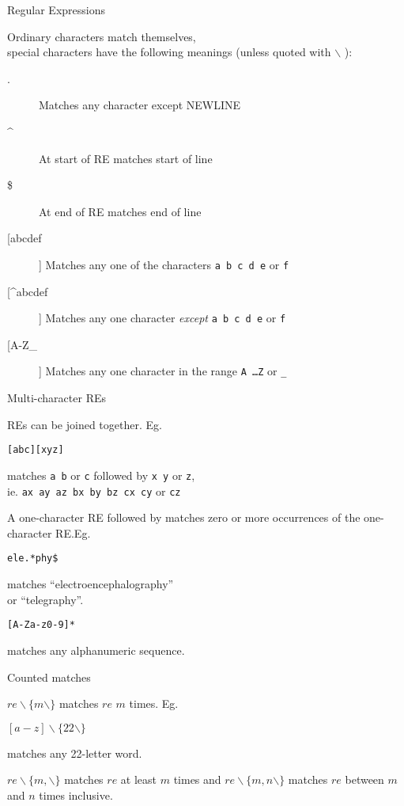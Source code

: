 \begin{slide}{}
Regular Expressions

Ordinary characters match themselves, \\
special characters have the
following meanings (unless quoted with $\backslash$ ):

\begin{description}
\item[.]
Matches any character except NEWLINE
\item[\^{}]
At start of RE matches start of line
\item[\$]
At end of RE matches end of line
\item[[abcdef]]
Matches any one of the characters {\tt a b c d e} or {\tt f}
\item[[\^{}abcdef]]
Matches any one character {\em except} {\tt a b c d e} or {\tt f}
\item[[A-Z\_{}]]
Matches any one character in the range {\tt A \ldots Z} or {\tt \_{}}
\end{description}
\end{slide}

\begin{slide}{}
Multi-character REs

REs can be joined together.  Eg.

{\tt [abc][xyz]}

matches {\tt a b} or {\tt c} followed by {\tt x y} or {\tt z}, \\
ie. {\tt ax ay az bx by bz cx cy} or {\tt cz}

A one-character RE followed by {\tt *} matches zero or more
occurrences of the one-character RE.\@  Eg.

{\tt ele.*phy\$}

matches ``electroencephalography'' \\
 or ``telegraphy''.

{\tt [A-Za-z0-9]*}

matches any alphanumeric sequence.
\end{slide}

\begin{slide}{}
Counted matches

\vspace{3cm}

$re \backslash \{ m \backslash \}$ matches $re$ $m$ times.  Eg.

$[a-z] \backslash \{22 \backslash \}$

matches any 22-letter word.

$re \backslash \{m,\backslash \}$ matches $re$ at least $m$ times and
$re \backslash \{m,n \backslash \}$ matches $re$ between $m$ and $n$
times inclusive.
\end{slide}

